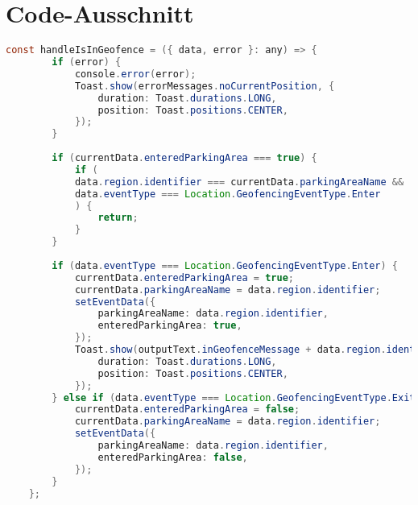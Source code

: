\appendix
\chapter{Code-Ausschnitt}
\label{appendix:geofencing}

\begin{lstlisting}[caption={Diese Funktion wird beim Betreten oder Verlassen eines Geofences ausgeführt. Im Fehlerfall bekommt der Nutzer per Toast mit, dass etwas schief gelaufen ist. Von Zeile 10 bis 17 wird sichergestellt, dass dasselbe Event nicht fälschlicherweise mehrmals hintereinander auftritt. Anschließend werden die Werte, ob das Geofence verlassen oder betreten wird, gesetzt. Beim Eintritt in das Geofence wird der Nutzer mittels Toast informiert. (Quelle: Eigene Implementierung)},captionpos=b, language=Java, label=lst:handleIsInGeofence]
	const handleIsInGeofence = ({ data, error }: any) => {
		if (error) {
			console.error(error);
			Toast.show(errorMessages.noCurrentPosition, {
				duration: Toast.durations.LONG,
				position: Toast.positions.CENTER,
			});
		}
		
		if (currentData.enteredParkingArea === true) {
			if (
			data.region.identifier === currentData.parkingAreaName &&
			data.eventType === Location.GeofencingEventType.Enter
			) {
				return;
			}
		}
		
		if (data.eventType === Location.GeofencingEventType.Enter) {
			currentData.enteredParkingArea = true;
			currentData.parkingAreaName = data.region.identifier;
			setEventData({
				parkingAreaName: data.region.identifier,
				enteredParkingArea: true,
			});
			Toast.show(outputText.inGeofenceMessage + data.region.identifier, {
				duration: Toast.durations.LONG,
				position: Toast.positions.CENTER,
			});
		} else if (data.eventType === Location.GeofencingEventType.Exit) {
			currentData.enteredParkingArea = false;
			currentData.parkingAreaName = data.region.identifier;
			setEventData({
				parkingAreaName: data.region.identifier,
				enteredParkingArea: false,
			});
		}
	};
\end{lstlisting}